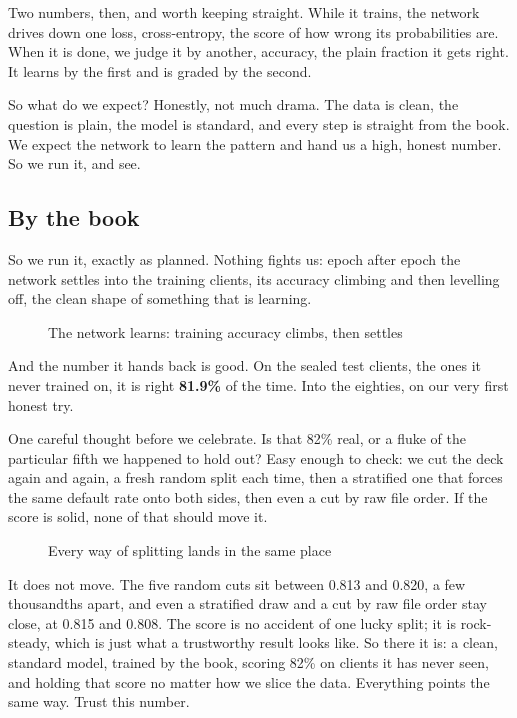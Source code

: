 \documentclass[11pt]{article} %
\begin{document}
Two numbers, then, and worth keeping straight. While it trains, the network drives down one loss, cross-entropy, the score of how wrong its probabilities are. When it is done, we judge it by another, accuracy, the plain fraction it gets right. It learns by the first and is graded by the second.

So what do we expect? Honestly, not much drama. The data is clean, the question is plain, the model is standard, and every step is straight from the book. We expect the network to learn the pattern and hand us a high, honest number. So we run it, and see.


\subsection{By the book}


So we run it, exactly as planned. Nothing fights us: epoch after epoch the network settles into the training clients, its accuracy climbing and then levelling off, the clean shape of something that is learning.

\begin{figure}[htbp]
\centering

\caption{The network learns: training accuracy climbs, then settles}
\end{figure}


And the number it hands back is good. On the sealed test clients, the ones it never trained on, it is right \textbf{81.9\%} of the time. Into the eighties, on our very first honest try.

One careful thought before we celebrate. Is that 82\% real, or a fluke of the particular fifth we happened to hold out? Easy enough to check: we cut the deck again and again, a fresh random split each time, then a stratified one that forces the same default rate onto both sides, then even a cut by raw file order. If the score is solid, none of that should move it.

\begin{figure}[htbp]
\centering

\caption{Every way of splitting lands in the same place}
\end{figure}


It does not move. The five random cuts sit between 0.813 and 0.820, a few thousandths apart, and even a stratified draw and a cut by raw file order stay close, at 0.815 and 0.808. The score is no accident of one lucky split; it is rock-steady, which is just what a trustworthy result looks like. So there it is: a clean, standard model, trained by the book, scoring 82\% on clients it has never seen, and holding that score no matter how we slice the data. Everything points the same way. Trust this number.
\end{document}
